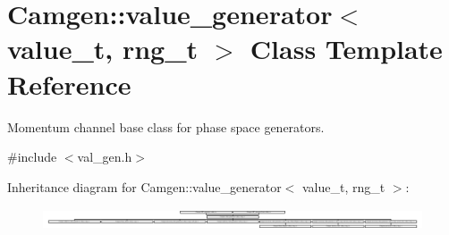\hypertarget{a00577}{}\section{Camgen\+:\+:value\+\_\+generator$<$ value\+\_\+t, rng\+\_\+t $>$ Class Template Reference}
\label{a00577}


Momentum channel base class for phase space generators.  




{\ttfamily \#include $<$val\+\_\+gen.\+h$>$}

Inheritance diagram for Camgen\+:\+:value\+\_\+generator$<$ value\+\_\+t, rng\+\_\+t $>$\+:\begin{figure}[H]
\begin{center}
\leavevmode
\includegraphics[height=0.621359cm]{a00577}
\end{center}
\end{figure}
